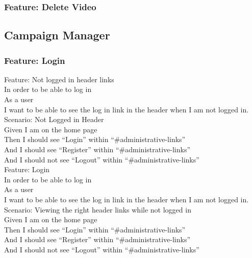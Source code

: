\documentclass[12pt]{article}
\begin{document}
\subsubsection{Feature: Delete Video}

\subsection{Campaign Manager}

\subsubsection{Feature: Login}


Feature: Not logged in header links \\
In order to be able to log in \\
As a user \\
I want to be able to see the log in link in the header when I am not logged in. \\

Scenario: Not Logged in Header  \\
Given I am on the home page \\
Then I should see ``Login'' within ``\#administrative-links'' \\
And I should see ``Register'' within ``\#administrative-links'' \\
And I should not see ``Logout'' within ``\#administrative-links'' \\

Feature: Login \\
  In order to be able to log in \\
  As a user \\
  I want to be able to see the log in link in the header when I am not logged in. \\

Scenario: Viewing the right header links while not logged in  \\
  Given I am on the home page \\
  Then I should see ``Login'' within ``\#administrative-links'' \\
  And I should see ``Register'' within ``\#administrative-links'' \\
  And I should not see ``Logout'' within ``\#administrative-links'' \\
\end{document}
